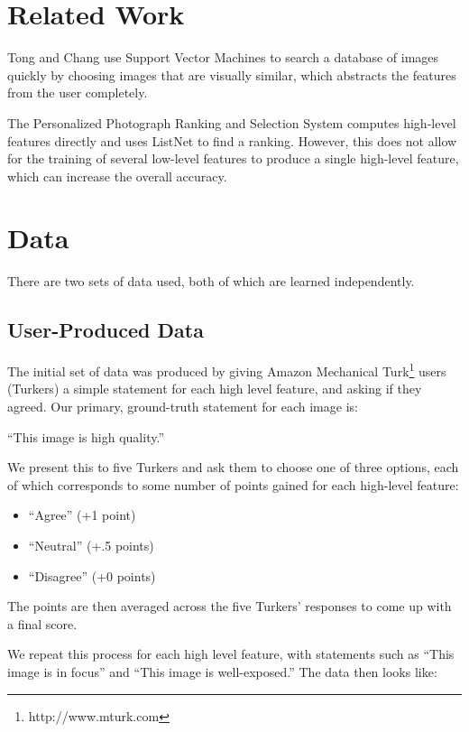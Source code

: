 \documentclass[10pt,twocolumn]{article}
\begin{document}
\section{Related Work}
Tong and Chang\cite{Tong:2001:SVM:500141.500159} use Support Vector Machines to search a database of images quickly by choosing images that are visually similar, which abstracts the features from the user completely.

The Personalized Photograph Ranking and Selection System\cite{Yeh:2010:PPR:1873951.1873963} computes high-level features directly and uses ListNet\cite{Cao:2007:LRP:1273496.1273513} to find a ranking. However, this does not allow for the training of several low-level features to produce a single high-level feature, which can increase the overall accuracy.

\section{Data}

There are two sets of data used, both of which are learned independently.

\subsection{User-Produced Data}
\label{turkdata}
The initial set of data was produced by giving Amazon Mechanical Turk\footnote{http://www.mturk.com} users (Turkers) a simple statement for each high level feature, and asking if they agreed. Our primary, ground-truth statement for each image is:

``This image is high quality.''

We present this to five Turkers and ask them to choose one of three options, each of which corresponds to some number of points gained for each high-level feature:

\begin{itemize}
\item ``Agree'' (+1 point)
\item ``Neutral'' (+.5 points)
\item ``Disagree'' (+0 points)
\end{itemize}
The points are then averaged across the five Turkers' responses to come up with a final score.

We repeat this process for each high level feature, with statements such as ``This image is in focus'' and ``This image is well-exposed.'' The data then looks like:
\end{document}
